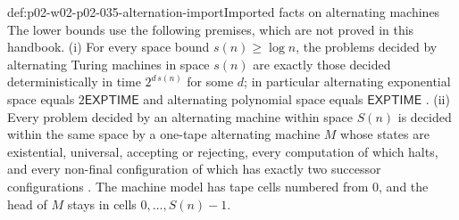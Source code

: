 \begin{proofboundary}{def:p02-w02-p02-035-alternation-import}{Imported facts on alternating machines}
The lower bounds use the following premises, which are not proved in this
handbook.  (i) For every space bound \(s(n)\geq\log n\), the problems
decided by alternating Turing machines in space \(s(n)\) are exactly those
decided deterministically in time \(2^{d\,s(n)}\) for some \(d\); in
particular alternating exponential space equals \(2\mathsf{EXPTIME}\) and
alternating polynomial space equals \(\mathsf{EXPTIME}\)
\cite[defs.~4.1 and 4.2 and sect.~4.1]{Gradel1999}.  (ii) Every problem
decided by an alternating machine within space \(S(n)\) is decided within the
same space by a one-tape alternating machine \(M\) whose states are
existential, universal, accepting or rejecting, every computation of which
halts, and every non-final configuration of which has exactly two successor
configurations \cite[proof of thm.~4.4]{Gradel1999}.  The machine model has
tape cells numbered from \(0\), and the head of \(M\) stays in cells
\(0,\ldots,S(n)-1\).
\end{proofboundary}

